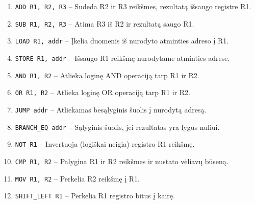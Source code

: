 \documentclass[a4paper,12pt]{article}
\begin{document}
\begin{enumerate}
    \item \texttt{ADD R1, R2, R3} – Sudeda R2 ir R3 reikšmes, rezultatą išsaugo registre R1.
    \item \texttt{SUB R1, R2, R3} – Atima R3 iš R2 ir rezultatą saugo R1.
    \item \texttt{LOAD R1, addr} – Įkelia duomenis iš nurodyto atminties adreso į R1.
    \item \texttt{STORE R1, addr} – Išsaugo R1 reikšmę nurodytame atminties adrese.
    \item \texttt{AND R1, R2} – Atlieka loginę AND operaciją tarp R1 ir R2.
    \item \texttt{OR R1, R2} – Atlieka loginę OR operaciją tarp R1 ir R2.
    \item \texttt{JUMP addr} – Atliekamas besąlyginis šuolis į nurodytą adresą.
    \item \texttt{BRANCH\_EQ addr} – Sąlyginis šuolis, jei rezultatas yra lygus nuliui.
    \item \texttt{NOT R1} – Invertuoja (logiškai neigia) registro R1 reikšmę.
    \item \texttt{CMP R1, R2} – Palygina R1 ir R2 reikšmes ir nustato vėliavų būseną.
    \item \texttt{MOV R1, R2} – Perkelia R2 reikšmę į R1.
    \item \texttt{SHIFT\_LEFT R1} – Perkelia R1 registro bitus į kairę.\\
\end{enumerate}
\end{document}
